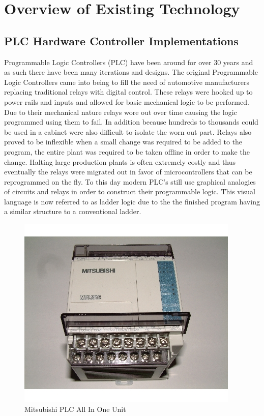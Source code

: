 
\chapter{Overview of Existing Technology}
\section{PLC Hardware Controller Implementations}
Programmable Logic Controllers (PLC) have been around for over 30 years and as such there have been many iterations and designs. The original Programmable Logic Controllers came into being to fill the need of automotive manufacturers replacing traditional relays with digital control. These relays were hooked up to power rails and inputs and allowed for basic mechanical logic to be performed. Due to their mechanical nature relays wore out over time causing the logic programmed using them to fail. In addition because hundreds to thousands could be used in a cabinet were also difficult to isolate the worn out part. Relays also proved to be inflexible when a small change was required to be added to the program, the entire plant was required to be taken offline in order to make the change. Halting large production plants is often extremely costly and thus eventually the relays were migrated out in favor of microcontrollers that can be reprogrammed on the fly. To this day modern PLC's still use graphical analogies of circuits and relays in order to construct their programmable logic. This visual language is now referred to as ladder logic due to the the finished program having a similar structure to a conventional ladder. 

\begin{figure}[htp]
    \centering
    \includegraphics[width=\imgmedphoto]{./images/c01_mitsubishiplc.jpg}
    \caption{Mitsubishi PLC All In One Unit \cite{img_c01_MitsubishiPlc}}
    \label{img:mitsubishiplc}
\end{figure}

